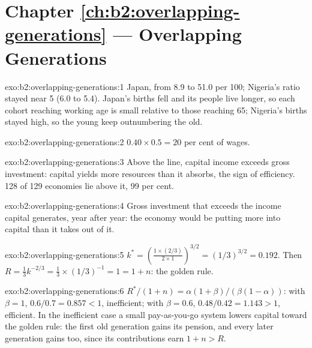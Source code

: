\section*{Chapter \ref{ch:b2:overlapping-generations} --- Overlapping Generations}

\begin{solution}{exo:b2:overlapping-generations:1}
Japan, from 8.9 to 51.0 per 100; Nigeria's ratio stayed near 5 (6.0 to 5.4). Japan's births fell and its people live longer, so each cohort reaching
working age is small relative to those reaching 65; Nigeria's births stayed high, so the young keep outnumbering the old.
\end{solution}

\begin{solution}{exo:b2:overlapping-generations:2}
$0.40 \times 0.5 = 20$ per cent of wages.
\end{solution}

\begin{solution}{exo:b2:overlapping-generations:3}
Above the line, capital income exceeds gross investment: capital yields more resources than it absorbs, the sign of
efficiency. 128 of 129 economies lie above it, 99 per cent.
\end{solution}

\begin{solution}{exo:b2:overlapping-generations:4}
Gross investment that exceeds the income capital generates, year after year: the economy would be putting more into
capital than it takes out of it.
\end{solution}

\begin{solution}{exo:b2:overlapping-generations:5}
$k^* = \left(\frac{1 \times (2/3)}{2 \times 1}\right)^{3/2} = (1/3)^{3/2} = 0.192$. Then $R = \tfrac13 k^{-2/3} = \tfrac13 \times (1/3)^{-1} = 1 = 1 + n$: the golden rule.
\end{solution}

\begin{solution}{exo:b2:overlapping-generations:6}
$R^*/(1 + n) = \alpha(1 + \beta)/(\beta(1 - \alpha))$: with $\beta = 1$, $0.6/0.7 = 0.857 < 1$, inefficient; with $\beta = 0.6$, $0.48/0.42 = 1.143 > 1$, efficient. In the inefficient case a small pay-as-you-go system lowers capital
toward the golden rule: the first old generation gains its pension, and every later generation gains too, since its
contributions earn $1 + n > R$.
\end{solution}

